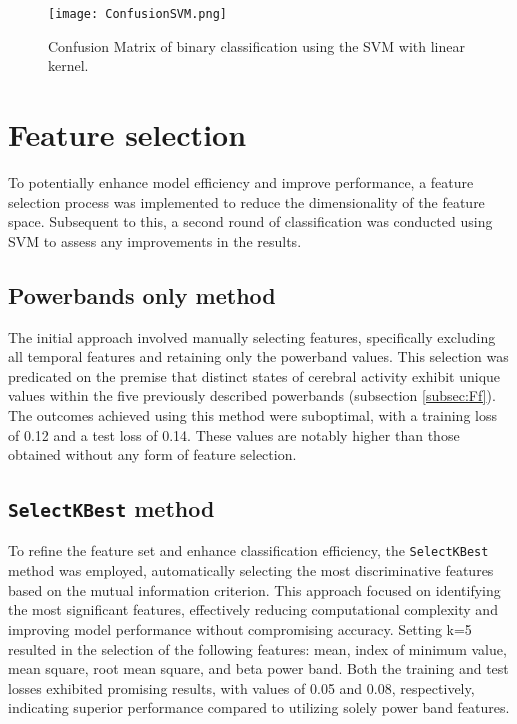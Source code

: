 \documentclass[conference]{IEEEtran}
\begin{document}
\begin{figure}[htbp]
\centerline{\texttt{[image: ConfusionSVM.png]}}
\caption{Confusion Matrix of binary classification using the SVM with linear kernel.}
\label{figcmRF}
\end{figure}


\vspace{2mm}
\section{Feature selection}
\vspace{2mm}

To potentially enhance model efficiency and improve performance, a feature selection process was implemented to reduce the dimensionality of the feature space. Subsequent to this, a second round of classification was conducted using SVM to assess any improvements in the results.

\subsection{Powerbands only method}

The initial approach involved manually selecting features, specifically excluding all temporal features and retaining only the powerband values. This selection was predicated on the premise that distinct states of cerebral activity exhibit unique values within the five previously described powerbands (subsection \ref{subsec:Ff}). The outcomes achieved using this method were suboptimal, with a training loss of 0.12 and a test loss of 0.14. These values are notably higher than those obtained without any form of feature selection.

\subsection{\texttt{SelectKBest} method}

To refine the feature set and enhance classification efficiency, the \texttt{SelectKBest} method was employed, automatically selecting the most discriminative features based on the mutual information criterion. This approach focused on identifying the most significant features, effectively reducing computational complexity and improving model performance without compromising accuracy.  Setting k=5 resulted in the selection of the following features: mean, index of minimum value, mean square, root mean square, and beta power band. Both the training and test losses exhibited promising results, with values of 0.05 and 0.08, respectively, indicating superior performance compared to utilizing solely power band features.
\end{document}
